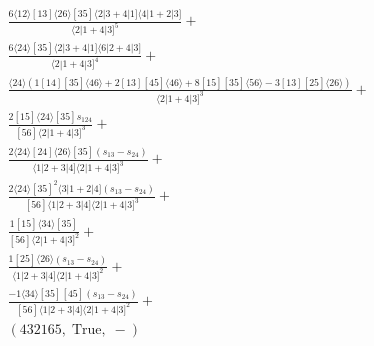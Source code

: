 \documentclass[varwidth, border=5pt]{standalone}
\begin{document}
\begin{my}
$\begin{gathered}
\scriptscriptstyle\frac{6⟨12⟩[13]⟨26⟩[35]⟨2|3+4|1]⟨4|1+2|3]}{⟨2|1+4|3]^5}+\\
\scriptscriptstyle\frac{6⟨24⟩[35]⟨2|3+4|1]⟨6|2+4|3]}{⟨2|1+4|3]^4}+\\
\scriptscriptstyle\frac{⟨24⟩(1[14][35]⟨46⟩+2[13][45]⟨46⟩+8[15][35]⟨56⟩-3[13][25]⟨26⟩)}{⟨2|1+4|3]^3}+\\
\scriptscriptstyle\frac{2[15]⟨24⟩[35]s_{124}}{[56]⟨2|1+4|3]^3}+\\
\scriptscriptstyle\frac{2⟨24⟩[24]⟨26⟩[35](s_{13}-s_{24})}{⟨1|2+3|4]⟨2|1+4|3]^3}+\\
\scriptscriptstyle\frac{2⟨24⟩[35]^2⟨3|1+2|4](s_{13}-s_{24})}{[56]⟨1|2+3|4]⟨2|1+4|3]^3}+\\
\scriptscriptstyle\frac{1[15]⟨34⟩[35]}{[56]⟨2|1+4|3]^2}+\\
\scriptscriptstyle\frac{1[25]⟨26⟩(s_{13}-s_{24})}{⟨1|2+3|4]⟨2|1+4|3]^2}+\\
\scriptscriptstyle\frac{-1⟨34⟩[35][45](s_{13}-s_{24})}{[56]⟨1|2+3|4]⟨2|1+4|3]^2}+\\
\scriptscriptstyle(432165,\;\text{True},\;-)\phantom{+}
\end{gathered}$
\end{my}
\end{document}
